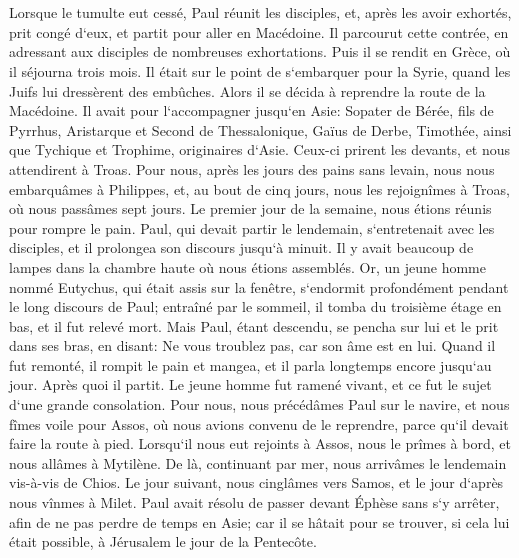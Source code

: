 \chapter{}

\verse Lorsque le tumulte eut cessé, Paul réunit les disciples, et, après les avoir exhortés, prit congé d`eux, et partit pour aller en Macédoine. 
\verse Il parcourut cette contrée, en adressant aux disciples de nombreuses exhortations. 
\verse Puis il se rendit en Grèce, où il séjourna trois mois. Il était sur le point de s`embarquer pour la Syrie, quand les Juifs lui dressèrent des embûches. Alors il se décida à reprendre la route de la Macédoine. 
\verse Il avait pour l`accompagner jusqu`en Asie: Sopater de Bérée, fils de Pyrrhus, Aristarque et Second de Thessalonique, Gaïus de Derbe, Timothée, ainsi que Tychique et Trophime, originaires d`Asie. 
\verse Ceux-ci prirent les devants, et nous attendirent à Troas. 
\verse Pour nous, après les jours des pains sans levain, nous nous embarquâmes à Philippes, et, au bout de cinq jours, nous les rejoignîmes à Troas, où nous passâmes sept jours. 
\verse Le premier jour de la semaine, nous étions réunis pour rompre le pain. Paul, qui devait partir le lendemain, s`entretenait avec les disciples, et il prolongea son discours jusqu`à minuit. 
\verse Il y avait beaucoup de lampes dans la chambre haute où nous étions assemblés. 
\verse Or, un jeune homme nommé Eutychus, qui était assis sur la fenêtre, s`endormit profondément pendant le long discours de Paul; entraîné par le sommeil, il tomba du troisième étage en bas, et il fut relevé mort. 
\verse Mais Paul, étant descendu, se pencha sur lui et le prit dans ses bras, en disant: Ne vous troublez pas, car son âme est en lui. 
\verse Quand il fut remonté, il rompit le pain et mangea, et il parla longtemps encore jusqu`au jour. Après quoi il partit. 
\verse Le jeune homme fut ramené vivant, et ce fut le sujet d`une grande consolation. 
\verse Pour nous, nous précédâmes Paul sur le navire, et nous fîmes voile pour Assos, où nous avions convenu de le reprendre, parce qu`il devait faire la route à pied. 
\verse Lorsqu`il nous eut rejoints à Assos, nous le prîmes à bord, et nous allâmes à Mytilène. 
\verse De là, continuant par mer, nous arrivâmes le lendemain vis-à-vis de Chios. Le jour suivant, nous cinglâmes vers Samos, et le jour d`après nous vînmes à Milet. 
\verse Paul avait résolu de passer devant Éphèse sans s`y arrêter, afin de ne pas perdre de temps en Asie; car il se hâtait pour se trouver, si cela lui était possible, à Jérusalem le jour de la Pentecôte. 
